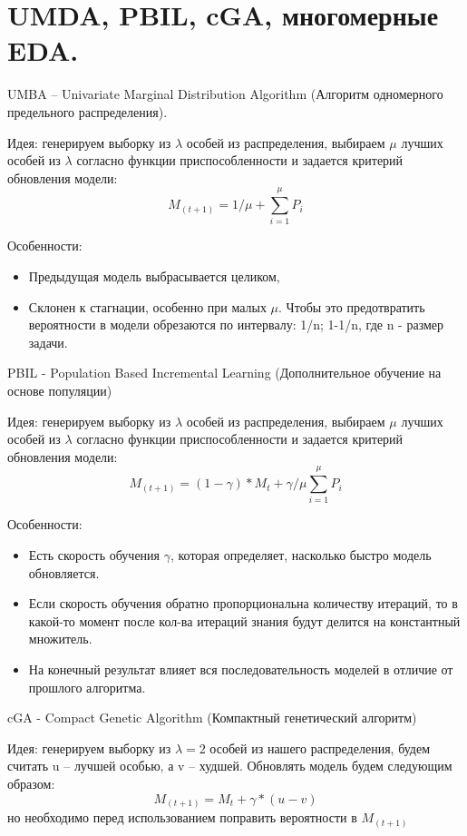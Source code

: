\section{UMDA, PBIL, cGA, многомерные EDA.}

UMBA – Univariate Marginal Distribution Algorithm (Алгоритм одномерного предельного распределения).

Идея: генерируем выборку из $\lambda$ особей из распределения, выбираем $\mu$ лучших особей из $\lambda$ согласно функции приспособленности и задается критерий обновления модели: $$M_{(t+1)} =  1/\mu + \sum_{i=1}^{\mu} P_i $$

Особенности: 

\begin{itemize}
      \item Предыдущая модель выбрасывается целиком, 
      \item Склонен к стагнации, особенно при малых $\mu$. Чтобы это предотвратить вероятности в модели обрезаются по интервалу: 1/n; 1-1/n, где  n -  размер задачи.
   \end{itemize}

PBIL - Population Based Incremental Learning (Дополнительное обучение на основе популяции)

Идея: генерируем выборку из $\lambda$ особей из распределения, выбираем $\mu$ лучших особей из $\lambda$ согласно функции приспособленности и задается критерий обновления модели: $$M_{(t+1)} =  (1 - \gamma)*M_t +\gamma/\mu\sum_{i=1}^{\mu} P_i $$

Особенности:
\begin{itemize}
      \item Есть скорость обучения $\gamma$, которая определяет, насколько быстро модель обновляется.
      \item Если скорость обучения обратно пропорциональна количеству итераций, то в какой-то момент после кол-ва итераций знания будут делится на константный множитель.
      \item На конечный результат влияет вся последовательность моделей в отличие от прошлого алгоритма.
   \end{itemize}



cGA - Compact Genetic Algorithm (Компактный генетический алгоритм)

Идея: генерируем выборку из $\lambda=2$ особей из нашего распределения, будем считать u – лучшей особью, а v – худшей. Обновлять модель будем следующим образом:  $$M_{(t+1)} = M_t +\gamma*(u-v) $$ но необходимо перед использованием поправить вероятности в $M_{(t+1)}$

